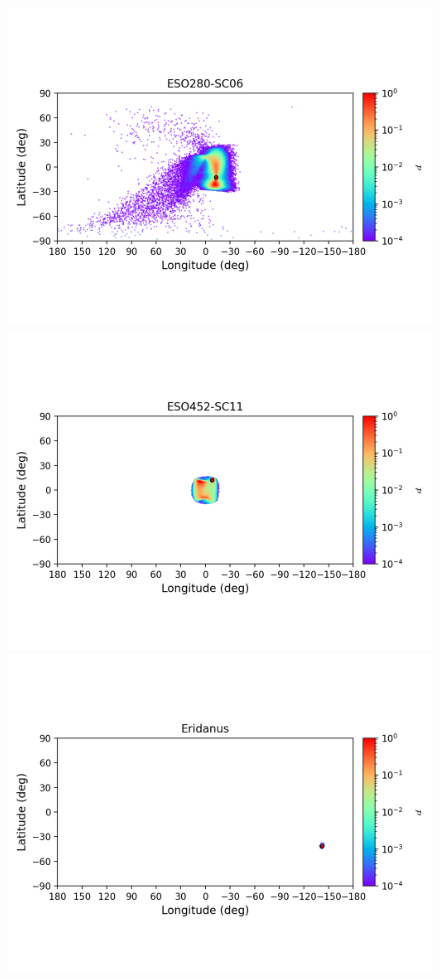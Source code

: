 \begin{figure}
        \includegraphics[clip=true, trim = 0mm 20mm 0mm 10mm, width=1\columnwidth]{images/error_plots_ESO280-SC06.png}
        \includegraphics[clip=true, trim = 0mm 20mm 0mm 10mm, width=1\columnwidth]{images/error_plots_ESO452-SC11.png}
        \includegraphics[clip=true, trim = 0mm 20mm 0mm 10mm, width=1\columnwidth]{images/error_plots_Eridanus.png}

\end{figure}
